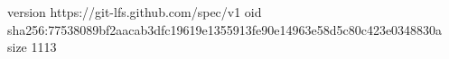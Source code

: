 version https://git-lfs.github.com/spec/v1
oid sha256:77538089bf2aacab3dfc19619e1355913fe90e14963e58d5c80c423e0348830a
size 1113
